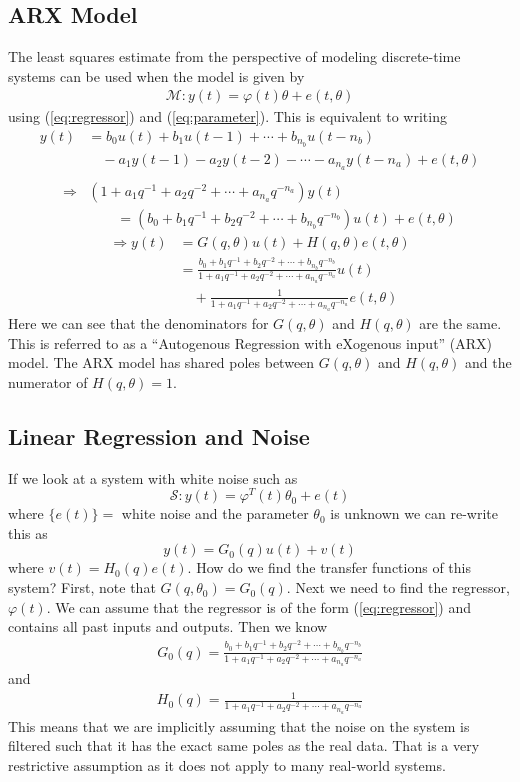 \subsection{ARX Model}
The least squares estimate from the perspective of modeling discrete-time systems can be used when the model is given by
\begin{align}
\mathcal{M}: y(t) = \varphi(t)\theta + e(t,\theta)
\end{align}
using (\ref{eq:regressor}) and (\ref{eq:parameter}). This is equivalent to writing
\begin{align*}
y(t) &= b_0u(t) + b_1u(t-1) + \cdots + b_{n_b}u(t-n_b) \\
&\quad- a_1y(t-1) - a_2y(t-2) - \cdots - a_{n_a}y(t-n_a) + e(t,\theta) \\
\end{align*}
\begin{align*}
\Rightarrow &(1+a_1q^{-1}+a_2q^{-2}+\cdots+a_{n_a}q^{-n_a})y(t) \\
&\qquad = (b_0+b_1q^{-1}+b_2q^{-2}+\cdots+b_{n_b}q^{-n_b})u(t) + e(t,\theta)
\end{align*}
\begin{align*}
\Rightarrow y(t) &= G(q,\theta)u(t) + H(q,\theta)e(t,\theta) \\
&= \frac{b_0+b_1q^{-1}+b_2q^{-2}+\cdots+b_{n_b}q^{-n_b}}{1+a_1q^{-1}+a_2q^{-2}+\cdots+a_{n_a}q^{-n_a}}u(t) \\
&\quad + \frac{1}{1+a_1q^{-1}+a_2q^{-2}+\cdots+a_{n_a}q^{-n_a}}e(t,\theta)
\end{align*}
Here we can see that the denominators for $G(q,\theta)$ and $H(q,\theta)$ are the same. This is referred to as a ``Autogenous Regression with eXogenous input'' (ARX) model. The ARX model has shared poles between $G(q,\theta)$ and $H(q,\theta)$ and the numerator of $H(q,\theta)=1$.

\subsection{Linear Regression and Noise}
If we look at a system with white noise such as
$$\mathcal{S}: y(t) = \varphi^T(t)\theta_0 + e(t)$$
where $\{e(t)\}=$ white noise and the parameter $\theta_0$ is unknown we can re-write this as
$$y(t) = G_0(q)u(t) + v(t)$$
where $v(t)=H_0(q)e(t)$. How do we find the transfer functions of this system? First, note that $G(q,\theta_0)=G_0(q)$. Next we need to find the regressor, $\varphi(t)$. We can assume that the regressor is of the form (\ref{eq:regressor}) and contains all past inputs and outputs. Then we know
\begin{align}
\label{eq:g}
G_0(q) = \frac{b_0+b_1q^{-1}+b_2q^{-2}+\cdots+b_{n_b}q^{-n_b}}{1+a_1q^{-1}+a_2q^{-2}+\cdots+a_{n_a}q^{-n_a}}
\end{align}
and
\begin{align}
\label{eq:h}
H_0(q) = \frac{1}{1+a_1q^{-1}+a_2q^{-2}+\cdots+a_{n_a}q^{-n_a}}
\end{align}
This means that we are implicitly assuming that the noise on the system is filtered such that it has the exact same poles as the real data. That is a very restrictive assumption as it does not apply to many real-world systems.

